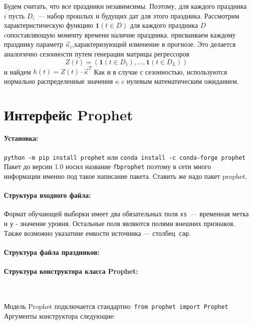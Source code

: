 \documentclass[a4paper,14pt]{extarticle}
\begin{document}
Будем считать, что все праздники незавимсимы. Поэтому, для каждого праздника $i$ пусть $D_i$~--- набор прошлых
и будущих дат для этого праздника. 
Рассмотрим характеристическую функцию $\mathbf{1}(t \in D)$ для каждого праздника $D$ cопоставляющую моменту времени наличие праздника. присваиваем каждому празднику параметр $\vec\kappa_i$,характеризующий изменение в прогнозе. 
Это делается аналогично сезонности путем генерации матрицы
регрессоров
$$
Z(t) = (\mathbf{1}(t \in D_1),\ldots, \mathbf{1}(t \in D_L))
$$
и найдем $h(t) = Z(t)\cdot\vec{\kappa}^T$
Как и в случае с сезонностью, используются нормально распределенные значения $\kappa$ c нулевым математическим ожиданием.


\section{Интерфейс Prophet}

\paragraph{Установка:}
\verb"python -m pip install prophet" или \verb"conda install -c conda-forge prophet"
Пакет до версии 1.0 носил название \texttt{fbprophet} поэтому в сети много информации именно под такое написание пакета. Ставить же надо пакет prophet.

\paragraph{Структура входного файла:}
Формат обучающей выборки имеет два обязательных поля \texttt{xs}~--- временная метка и \texttt{y} - значение уровня. Остальные поля являются полями внешних признаков.
Также возможно указатние емкости источника --- столбец~\texttt{cap}.

\paragraph{Структура файла праздников:}


\paragraph{Структура конструктора класса Prophet:}~\par

Модель Prophet подключается стандартно: \texttt{from prophet import Prophet}
Аргументы конструктора следующие:
\end{document}
